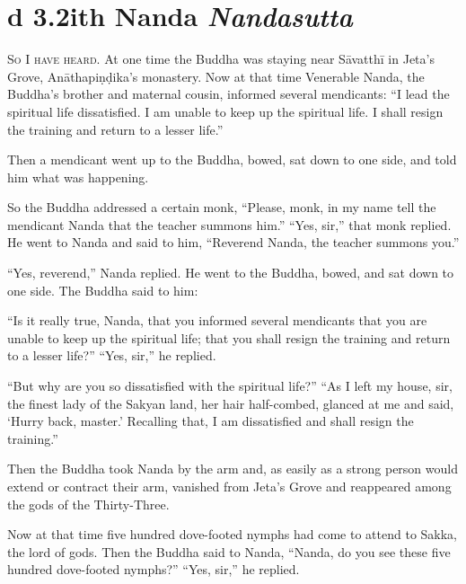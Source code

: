 \documentclass[12pt,openany]{book}%
\newcommand*{\suttatitleacronym}[1]{\smaller[2]{#1}\vspace*{.3em}}
\newcommand*{\suttatitletranslation}[1]{\linebreak{#1}}
\newcommand*{\suttatitleroot}[1]{\linebreak\smaller[2]\itshape{#1}}
\newcommand*{\tocacronym}[1]{\hspace*{-3.3em}{#1}\quad}
\newcommand*{\toctranslation}[1]{#1}
\newcommand*{\tocroot}[1]{(\textit{#1})}
\newcommand*{\scevam}[1]{\textsc{#1}}
\begin{document}
%
\section*{{\suttatitleacronym Ud 3.2}{\suttatitletranslation With Nanda }{\suttatitleroot Nandasutta}}
\addcontentsline{toc}{section}{\tocacronym{Ud 3.2} \toctranslation{With Nanda } \tocroot{Nandasutta}}

\scevam{So I have heard. }At one time the Buddha was staying near \textsanskrit{Sāvatthī} in Jeta’s Grove, \textsanskrit{Anāthapiṇḍika}’s monastery. Now at that time Venerable Nanda, the Buddha’s brother and maternal cousin, informed several mendicants: “I lead the spiritual life dissatisfied. I am unable to keep up the spiritual life. I shall resign the training and return to a lesser life.” 

Then a mendicant went up to the Buddha, bowed, sat down to one side, and told him what was happening. 

So the Buddha addressed a certain monk, “Please, monk, in my name tell the mendicant Nanda that the teacher summons him.” “Yes, sir,” that monk replied. He went to Nanda and said to him, “Reverend Nanda, the teacher summons you.” 

“Yes, reverend,” Nanda replied. He went to the Buddha, bowed, and sat down to one side. The Buddha said to him: 

“Is it really true, Nanda, that you informed several mendicants that you are unable to keep up the spiritual life; that you shall resign the training and return to a lesser life?” “Yes, sir,” he replied. 

“But why are you so dissatisfied with the spiritual life?” “As I left my house, sir, the finest lady of the Sakyan land, her hair half-combed, glanced at me and said, ‘Hurry back, master.’ Recalling that, I am dissatisfied and shall resign the training.” 

Then the Buddha took Nanda by the arm and, as easily as a strong person would extend or contract their arm, vanished from Jeta’s Grove and reappeared among the gods of the Thirty-Three. 

Now at that time five hundred dove-footed nymphs had come to attend to Sakka, the lord of gods. Then the Buddha said to Nanda, “Nanda, do you see these five hundred dove-footed nymphs?” “Yes, sir,” he replied. 
\end{document}
